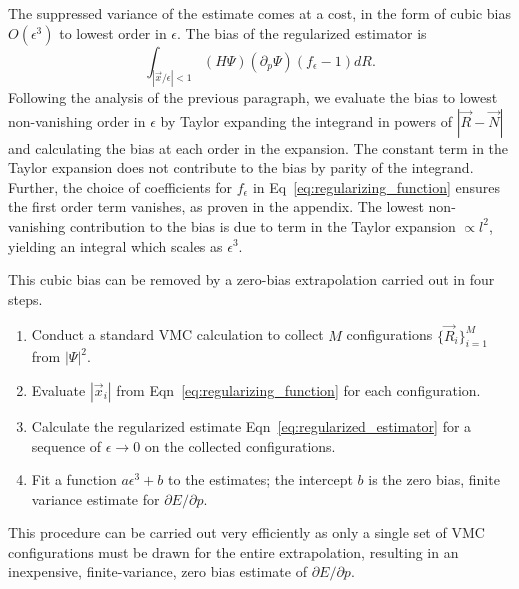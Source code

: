 \documentclass[twocolumn]{revtex4-1}
\begin{document}
The suppressed variance of the estimate comes at a cost, in the form of cubic bias $O(\epsilon^3)$ to lowest order in $\epsilon$.
The bias of the regularized estimator is
\begin{equation}
\int_{|\vec{x}/\epsilon|< 1} (H\Psi) (\partial_p \Psi) (f_\epsilon - 1) dR.
\label{eq:estimator_bias}
\end{equation}
Following the analysis of the previous paragraph, we evaluate the bias to lowest non-vanishing order in $\epsilon$ by Taylor expanding the integrand in powers of $|\vec{R} - \vec{N}|$ and calculating the bias at each order in the expansion.
The constant term in the Taylor expansion does not contribute to the bias by parity of the integrand.
Further, the choice of coefficients for $f_\epsilon$ in Eq~\ref{eq:regularizing_function} ensures the first order term vanishes, as proven in the appendix.
The lowest non-vanishing contribution to the bias is due to term in the Taylor expansion $\propto l^2$, yielding an integral which scales as $\epsilon^3$.

This cubic bias can be removed by a zero-bias extrapolation carried out in four steps.
\begin{enumerate}
\item Conduct a standard VMC calculation to collect $M$ configurations $\{\vec{R}_i\}_{i=1}^M$ from $|\Psi|^2$.
\item Evaluate $|\vec{x}_i|$ from Eqn~\ref{eq:regularizing_function} for each configuration.
\item Calculate the regularized estimate Eqn~\ref{eq:regularized_estimator} for a sequence of $\epsilon \rightarrow 0$ on the collected configurations.
\item Fit a function $a\epsilon^3 + b$ to the estimates; the intercept $b$ is the zero bias, finite variance estimate for $\partial E/\partial p$.
\end{enumerate}
This procedure can be carried out very efficiently as only a single set of VMC configurations must be drawn for the entire extrapolation, resulting in an inexpensive, finite-variance, zero bias estimate of $\partial E/\partial p$.
\end{document}
